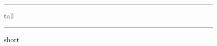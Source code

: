 \documentclass{memoir}
\begin{document}
\sloppy\Large
%
\lipsum[1]
%
\begin{figure}[t]
  \hrule height 7in
  \caption{tall}
\end{figure}
%
\begin{figure}[ht]
  \hrule height 1in
  \caption{short}
\end{figure}
%
\lipsum[2]
%
%
\lipsum[3-5]
%
\end{document}
